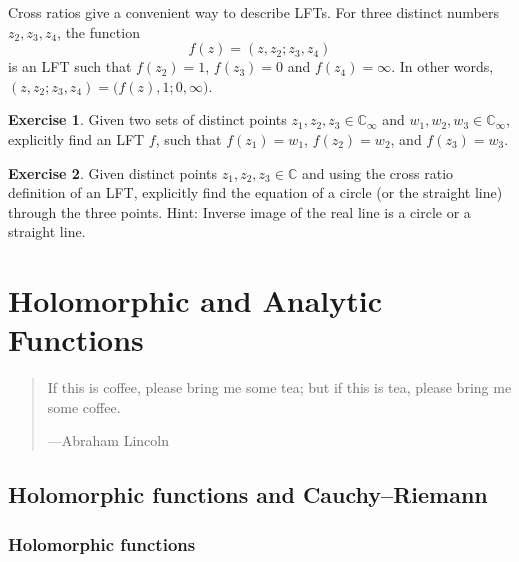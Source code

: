 \documentclass[12pt,openany]{book}
\newcommand{\C}{{\mathbb{C}}}
\theoremstyle{plain}
\theoremstyle{remark}
\theoremstyle{definition}
\newenvironment{exbox}{%
    \def\FrameCommand{\vrule width 1pt \relax\hspace{10pt}}%
    \MakeFramed{\advance\hsize-\width\FrameRestore}%
}{%
    \endMakeFramed
}
\newenvironment{myepigraph}{%
    \begin{quote}%
    \begingroup\itshape
}{%
    \endgroup%
    \end{quote}
}
\theoremstyle{exercise}
\newtheorem{exercise}{Exercise}[section]
\theoremstyle{example}
\begin{document}
Cross ratios give a convenient way to describe LFTs.
For three distinct numbers $z_2,z_3,z_4$, the
function
\begin{equation*}
f(z) =
(z,z_2;z_3,z_4)
\end{equation*}
is an LFT such that $f(z_2) = 1$, $f(z_3)=0$ and $f(z_4) = \infty$.
In other words,
$(z,z_2;z_3,z_4) = 
\bigl(f(z),1;0,\infty\bigr)$.

\begin{exbox}
\begin{exercise}
Given two sets of distinct points $z_1,z_2,z_3 \in \C_\infty$
and $w_1,w_2,w_3 \in \C_\infty$, explicitly find an LFT $f$,
such that
$f(z_1) = w_1$,
$f(z_2) = w_2$, and
$f(z_3) = w_3$.
\end{exercise}

\begin{exercise}
Given distinct points $z_1,z_2,z_3 \in \C$ and
using the cross ratio definition of an LFT, explicitly find
the equation of a circle (or the straight line) through the three points.
Hint: Inverse image of the real line is a circle or a straight line.
\end{exercise}
\end{exbox}



\chapter{Holomorphic and Analytic Functions} \label{ch:holanal}

\begin{myepigraph}
If this is coffee, please bring me some tea; but if this is tea, please bring me some coffee.

---Abraham Lincoln
\end{myepigraph}


\section{Holomorphic functions and Cauchy--Riemann}
\label{sec:holfuncs}

\subsection{Holomorphic functions}
\end{document}
